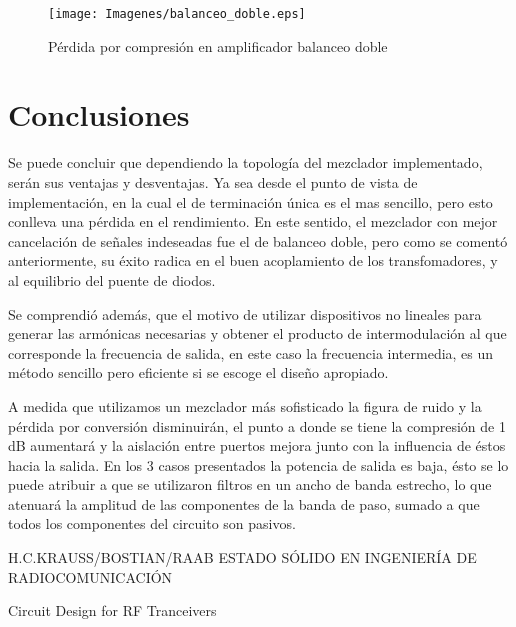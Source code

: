 \documentclass[conference]{IEEEtran}
\begin{document}
			\begin{figure}[h!]
			\centering
			\texttt{[image: Imagenes/balanceo\_doble.eps]} 
 			\caption{Pérdida por compresión en amplificador balanceo doble }
			\label{barridoBalanceDoble}
			\end{figure}
			
\section{Conclusiones}
Se puede concluir que dependiendo la topología del mezclador implementado, serán sus ventajas y desventajas. Ya sea desde el punto de vista de implementación, en la cual el de terminación única es el mas sencillo, pero esto conlleva una pérdida en el rendimiento. En este sentido, el mezclador con mejor cancelación de señales indeseadas fue el de balanceo doble, pero como se comentó anteriormente, su éxito radica en el buen acoplamiento de los transfomadores, y al equilibrio del puente de diodos. 

Se comprendió además, que el motivo de utilizar dispositivos no lineales para generar las armónicas necesarias y obtener el producto de intermodulación al que corresponde la frecuencia de salida, en este caso la frecuencia intermedia, es un método sencillo pero eficiente si se escoge el diseño apropiado.

A medida que utilizamos un mezclador más sofisticado la figura de ruido y la pérdida por conversión disminuirán, el punto a donde se tiene la compresión de 1 dB aumentará y la aislación entre puertos mejora junto con la influencia de éstos hacia la salida. En los 3 casos presentados la potencia de salida es baja, ésto se lo puede atribuir a que se utilizaron filtros en un ancho de banda estrecho, lo que atenuará la amplitud de las componentes de la banda de paso, sumado a que todos los componentes del circuito son pasivos. 
 

\begin{thebibliography}{1}

H.C.KRAUSS/BOSTIAN/RAAB ESTADO SÓLIDO EN INGENIERÍA DE RADIOCOMUNICACIÓN

Circuit Design for RF Tranceivers 
\end{thebibliography}

\end{document}
